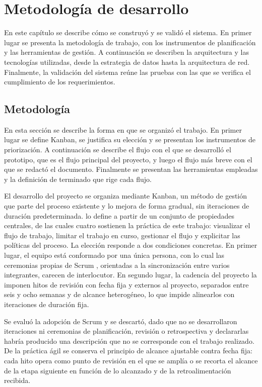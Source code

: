 \chapter{Metodología de desarrollo}
\label{ch:metodologia}

En este capítulo se describe cómo se construyó y se validó el sistema. En primer lugar se presenta la metodología de trabajo, con los instrumentos de planificación y las herramientas de gestión. A continuación se describen la arquitectura y las tecnologías utilizadas, desde la estrategia de datos hasta la arquitectura de red. Finalmente, la validación del sistema reúne las pruebas con las que se verifica el cumplimiento de los requerimientos.

\section{Metodología}
\label{sec:metodologia}

En esta sección se describe la forma en que se organizó el trabajo. En primer lugar se define Kanban, se justifica su elección y se presentan los instrumentos de priorización. A continuación se describe el flujo con el que se desarrolló el prototipo, que es el flujo principal del proyecto, y luego el flujo más breve con el que se redactó el documento. Finalmente se presentan las herramientas empleadas y la definición de terminado que rige cada flujo.

El desarrollo del proyecto se organiza mediante Kanban, un método de gestión que parte del proceso existente y lo mejora de forma gradual, sin iteraciones de duración predeterminada. \textcite{Anderson2010} lo define a partir de un conjunto de propiedades centrales, de las cuales cuatro sostienen la práctica de este trabajo: visualizar el flujo de trabajo, limitar el trabajo en curso, gestionar el flujo y explicitar las políticas del proceso. La elección responde a dos condiciones concretas. En primer lugar, el equipo está conformado por una única persona, con lo cual las ceremonias propias de Scrum \parencite{SchwaberSutherland2020}, orientadas a la sincronización entre varios integrantes, carecen de interlocutor. En segundo lugar, la cadencia del proyecto la imponen hitos de revisión con fecha fija y externos al proyecto, separados entre seis y ocho semanas y de alcance heterogéneo, lo que impide alinearlos con iteraciones de duración fija.

Se evaluó la adopción de Scrum y se descartó, dado que no se desarrollaron iteraciones ni ceremonias de planificación, revisión o retrospectiva y declararlas habría producido una descripción que no se corresponde con el trabajo realizado. De la práctica ágil se conserva el principio de alcance ajustable contra fecha fija: cada hito opera como punto de revisión en el que se amplía o se recorta el alcance de la etapa siguiente en función de lo alcanzado y de la retroalimentación recibida.

